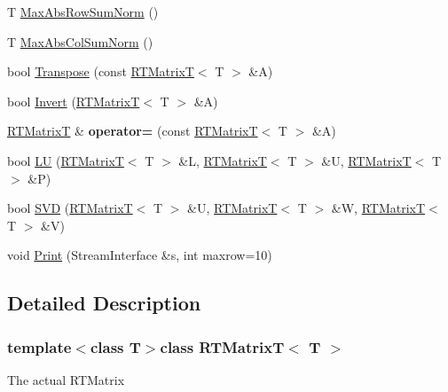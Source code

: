 \begin{DoxyCompactItemize}
T \hyperlink{classRTMatrixT_a42b86d8bf32b5e42292edff8d6e2bc2b}{MaxAbsRowSumNorm} ()
\item 
T \hyperlink{classRTMatrixT_a3a013b9fc461b06dbe2def2eb3318fb5}{MaxAbsColSumNorm} ()
\item 
bool \hyperlink{classRTMatrixT_a16014847a3d1982e3d11ed7ec2b22897}{Transpose} (const \hyperlink{classRTMatrixT}{RTMatrixT}$<$ T $>$ \&A)
\item 
bool \hyperlink{classRTMatrixT_a8b54fe4f49d5b892afa96e54ea4c8e5f}{Invert} (\hyperlink{classRTMatrixT}{RTMatrixT}$<$ T $>$ \&A)
\item 
\hypertarget{classRTMatrixT_a0ea9a7f1df85d8eef54009f607a9b029}{
\hyperlink{classRTMatrixT}{RTMatrixT} \& {\bfseries operator=} (const \hyperlink{classRTMatrixT}{RTMatrixT}$<$ T $>$ \&A)}
\label{classRTMatrixT_a0ea9a7f1df85d8eef54009f607a9b029}

\item 
bool \hyperlink{classRTMatrixT_a76c1f212c944b4de47e556172738cc24}{LU} (\hyperlink{classRTMatrixT}{RTMatrixT}$<$ T $>$ \&L, \hyperlink{classRTMatrixT}{RTMatrixT}$<$ T $>$ \&U, \hyperlink{classRTMatrixT}{RTMatrixT}$<$ T $>$ \&P)
\item 
bool \hyperlink{classRTMatrixT_a9e08c8785510d11b9df86800ca3179a8}{SVD} (\hyperlink{classRTMatrixT}{RTMatrixT}$<$ T $>$ \&U, \hyperlink{classRTMatrixT}{RTMatrixT}$<$ T $>$ \&W, \hyperlink{classRTMatrixT}{RTMatrixT}$<$ T $>$ \&V)
\item 
void \hyperlink{classRTMatrixT_afc165d73e0b9ac3caf53ddf241c73337}{Print} (StreamInterface \&s, int maxrow=10)
\end{DoxyCompactItemize}


\subsection{Detailed Description}
\subsubsection*{template$<$class T$>$class RTMatrixT$<$ T $>$}

The actual RTMatrix 

